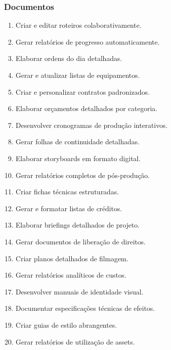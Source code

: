 \subsubsection{Documentos}
\begin{enumerate}
 \item Criar e editar roteiros colaborativamente.
 \item Gerar relatórios de progresso automaticamente.
 \item Elaborar ordens do dia detalhadas.
 \item Gerar e atualizar listas de equipamentos.
 \item Criar e personalizar contratos padronizados.
 \item Elaborar orçamentos detalhados por categoria.
 \item Desenvolver cronogramas de produção interativos.
 \item Gerar folhas de continuidade detalhadas.
 \item Elaborar storyboards em formato digital.
 \item Gerar relatórios completos de pós-produção.
 \item Criar fichas técnicas estruturadas.
 \item Gerar e formatar listas de créditos.
 \item Elaborar briefings detalhados de projeto.
 \item Gerar documentos de liberação de direitos.
 \item Criar planos detalhados de filmagem.
 \item Gerar relatórios analíticos de custos.
 \item Desenvolver manuais de identidade visual.
 \item Documentar especificações técnicas de efeitos.
 \item Criar guias de estilo abrangentes.
 \item Gerar relatórios de utilização de assets.
\end{enumerate}

